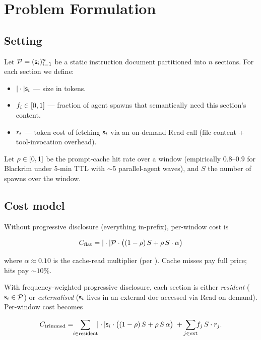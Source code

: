 \section{Problem Formulation}
\label{sec:problem}

\subsection{Setting}

Let $\mathcal{P} = (\mathsf{s}_i)_{i=1}^{n}$ be a static instruction document
partitioned into $n$ sections. For each section we define:

\begin{itemize}
  \item $|\cdot|{\mathsf{s}_i}$ — size in tokens.
  \item $f_i \in [0, 1]$ — fraction of agent spawns that
    semantically need this section's content.
  \item $r_i$ — token cost of fetching $\mathsf{s}_i$ via an
    on-demand Read call (file content + tool-invocation overhead).
\end{itemize}

Let $\rho \in [0, 1]$ be the prompt-cache hit rate over a window
(empirically $0.8$--$0.9$ for Blackrim under 5-min TTL with $\sim$5
parallel-agent waves), and $S$ the number of spawns over the window.

\subsection{Cost model}

Without progressive disclosure (everything in-prefix), per-window cost
is

\begin{equation}
  C_{\mathrm{flat}} = |\cdot|{\mathcal{P}} \cdot
    \big( (1 - \rho)\,S + \rho\,S \cdot \alpha \big)
  \label{eq:cost-flat}
\end{equation}

where $\alpha \approx 0.10$ is the cache-read multiplier (per
\cite{anthropic-cache}). Cache misses pay full price; hits pay
$\sim 10\%$.

With frequency-weighted progressive disclosure, each section is either
\emph{resident} ($\mathsf{s}_i \in \mathcal{P}$) or \emph{externalised}
(\(\mathsf{s}_i\) lives in an external doc accessed via Read on demand).
Per-window cost becomes

\begin{equation}
  \cost_{\mathrm{trimmed}} =
    \!\!\sum_{i \in \mathrm{resident}}\!\! \size{\sect} \cdot
      \big( (1 - \cachehit)\,S + \cachehit\,S\,\alpha \big)
    \;+\;
    \!\!\sum_{j \in \mathrm{ext}}\!\! \frequency_j \,S \cdot \readsize_j .
  \label{eq:cost-trimmed}
\end{equation}

